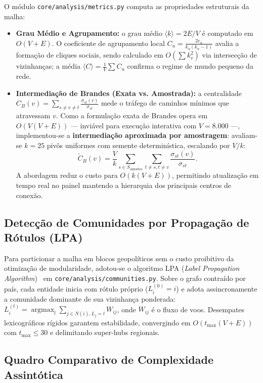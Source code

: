 \documentclass[11pt]{article}
\begin{document}
O módulo \texttt{core/analysis/metrics.py} computa as propriedades estruturais da malha:
\begin{itemize}
  \item \textbf{Grau Médio e Agrupamento:} o grau médio $\langle k \rangle = 2E/V$ é computado em $O(V + E)$. O coeficiente de agrupamento local $C_u = \frac{2 e_u}{k_u (k_u - 1)}$ avalia a formação de cliques sociais, sendo calculado em $O(\sum k_v^2)$ via intersecção de vizinhanças; a média $\langle C \rangle = \frac{1}{V}\sum C_u$ confirma o regime de mundo pequeno da rede.
  \item \textbf{Intermediação de Brandes (Exata vs. Amostrada):} a centralidade $C_B(v) = \sum_{s \neq v \neq t} \frac{\sigma_{st}(v)}{\sigma_{st}}$ mede o tráfego de caminhos mínimos que atravessam $v$. Como a formulação exata de Brandes opera em $O(V(V + E))$ --- inviável para execução interativa com $V = 8.000$ ---, implementou-se a \textbf{intermediação aproximada por amostragem}: avaliam-se $k = 25$ pivôs uniformes com semente determinística, escalando por $V/k$:
  \begin{equation}
  \tilde{C}_B(v) = \frac{V}{k} \sum_{s \in S_{\mathrm{amostra}}} \sum_{t \neq s, t \neq v} \frac{\sigma_{st}(v)}{\sigma_{st}}.
  \end{equation}
  A abordagem reduz o custo para $O(k(V + E))$, permitindo atualização em tempo real no painel mantendo a hierarquia dos principais centros de conexão.
\end{itemize}

\subsection{Detecção de Comunidades por Propagação de Rótulos (LPA)}

Para particionar a malha em blocos geopolíticos sem o custo proibitivo da otimização de modularidade, adotou-se o algoritmo LPA (\emph{Label Propagation Algorithm})~\cite{raghavan2007} em \texttt{core/analysis/communities.py}. Sobre o grafo contraído por país, cada entidade inicia com rótulo próprio ($L_i^{(0)} = i$) e adota assincronamente a comunidade dominante de sua vizinhança ponderada: $L_i^{(t)} = \operatorname{argmax}_l \sum_{j \in N(i), L_j = l} W_{ij}$, onde $W_{ij}$ é o fluxo de voos. Desempates lexicográficos rígidos garantem estabilidade, convergindo em $O(t_{\max}(V + E))$ com $t_{\max} \le 30$ e delimitando super-hubs regionais.

\subsection{Quadro Comparativo de Complexidade Assintótica}
\end{document}
